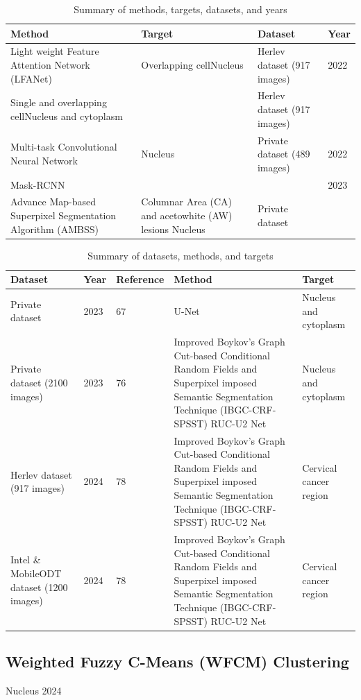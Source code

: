 \documentclass[final,5p,times,twocolumn,authoryear]{elsarticle}
\begin{document}
\begin{table}
\centering
\caption{Summary of methods, targets, datasets, and years}
\label{tab:summary}
\begin{tabular}{p{4.5cm} p{4.5cm} p{4.5cm} p{2cm}}
\hline
Method & Target & Dataset & Year \\
\hline
Light weight Feature Attention Network (LFANet) & Overlapping cellNucleus & Herlev dataset (917 images) & 2022 \\
\hline
Single and overlapping cellNucleus and cytoplasm & & Herlev dataset (917 images) & \\
\hline
Multi-task Convolutional Neural Network & Nucleus & Private dataset (489 images) & 2022 \\
\hline
Mask-RCNN & & & 2023 \\
\hline
Advance Map-based Superpixel Segmentation Algorithm (AMBSS) & Columnar Area (CA) and acetowhite (AW) lesions Nucleus & Private dataset & \\
\hline
\end{tabular}
\end{table}

\begin{table}
\centering
\caption{Summary of datasets, methods, and targets}
\label{tab:summary}
\begin{tabular}{p{3cm} p{1.5cm} p{1.5cm} p{5cm} p{3cm}}
\hline
Dataset & Year & Reference & Method & Target \\
\hline
Private dataset & 2023 & 67 & U-Net & Nucleus and cytoplasm \\
Private dataset (2100 images) & 2023 & 76 & Improved Boykov's Graph Cut-based Conditional Random Fields and Superpixel imposed Semantic Segmentation Technique (IBGC-CRF-SPSST) RUC-U2 Net & Nucleus and cytoplasm \\
Herlev dataset (917 images) & 2024 & 78 & Improved Boykov's Graph Cut-based Conditional Random Fields and Superpixel imposed Semantic Segmentation Technique (IBGC-CRF-SPSST) RUC-U2 Net & Cervical cancer region \\
Intel \& MobileODT dataset (1200 images) & 2024 & 78 & Improved Boykov's Graph Cut-based Conditional Random Fields and Superpixel imposed Semantic Segmentation Technique (IBGC-CRF-SPSST) RUC-U2 Net & Cervical cancer region \\
\hline
\end{tabular}
\end{table}

\subsection{Weighted Fuzzy C-Means (WFCM) Clustering}
Nucleus
2024
\end{document}
